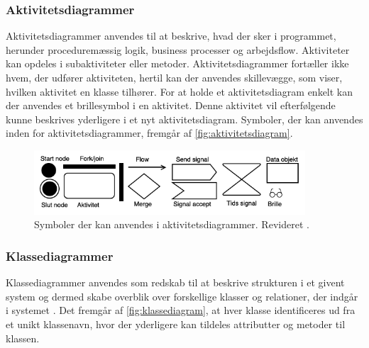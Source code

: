 \subsubsection{Aktivitetsdiagrammer} 
Aktivitetsdiagrammer anvendes til at beskrive, hvad der sker i programmet, herunder proceduremæssig logik, business processer og arbejdsflow. Aktiviteter kan opdeles i subaktiviteter eller metoder.  Aktivitetsdiagrammer fortæller ikke hvem, der udfører aktiviteten, hertil kan der anvendes skillevægge, som viser, hvilken aktivitet en klasse tilhører. For at holde et aktivitetsdiagram enkelt kan der anvendes et brillesymbol i en aktivitet. Denne aktivitet vil efterfølgende kunne beskrives yderligere i et nyt aktivitetsdiagram.\cite{Fowler2004} Symboler, der kan anvendes inden for aktivitetsdiagrammer, fremgår af \autoref{fig:aktivitetsdiagram}.

\begin{figure} [H]
\centering
\includegraphics[width=0.9\textwidth]{figures/aktivitetsdiagram}
\caption{Symboler der kan anvendes i aktivitetsdiagrammer. Revideret \cite{Fowler2004}.}
\label{fig:aktivitetsdiagram}
\end{figure}




\subsubsection{Klassediagrammer}
Klassediagrammer anvendes som redskab til at beskrive strukturen i et givent system og dermed skabe overblik over forskellige klasser og relationer, der indgår i systemet \cite{Fowler2004}. Det fremgår af \autoref{fig:klassediagram}, at hver klasse identificeres ud fra et unikt klassenavn, hvor der yderligere kan tildeles attributter og metoder til klassen.

